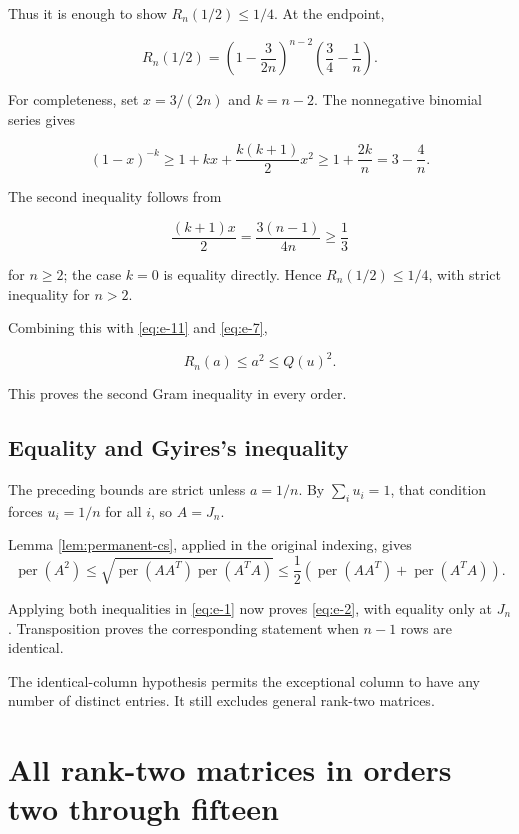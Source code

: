 \documentclass[11pt,a4paper]{article}
\theoremstyle{definition}
\theoremstyle{remark}
\begin{document}
Thus it is enough to show \(R_n(1/2)\le1/4\). At the endpoint,

\[
R_n(1/2)
=\left(1-\frac3{2n}\right)^{n-2}
\left(\frac34-\frac1n\right).
\]

For completeness, set \(x=3/(2n)\) and \(k=n-2\). The nonnegative
binomial series gives

\[
(1-x)^{-k}\ge1+kx+\frac{k(k+1)}2x^2
\ge1+\frac{2k}{n}=3-\frac4n.
\]

The second inequality follows from

\[
\frac{(k+1)x}{2}=\frac{3(n-1)}{4n}\ge\frac13
\]

for \(n\ge2\); the case \(k=0\) is equality directly. Hence
\(R_n(1/2)\le1/4\), with strict inequality for \(n>2\).

Combining this with \eqref{eq:e-11} and \eqref{eq:e-7},

\begin{equation}\label{eq:e-12}
R_n(a)\le a^2\le Q(u)^2.
\end{equation}

This proves the second Gram inequality in every order.

\subsection{Equality and Gyires's
inequality}\label{special-equality-and-the-original-gyires-inequality}

The preceding bounds are strict unless \(a=1/n\). By \(\sum_i u_i=1\),
that condition forces \(u_i=1/n\) for all \(i\), so \(A=J_n\).

Lemma \ref{lem:permanent-cs}, applied in the original indexing, gives \[
\operatorname{per}(A^2)\le\sqrt{\operatorname{per}(AA^T)\operatorname{per}(A^TA)}
\le\frac12\left(\operatorname{per}(AA^T)+\operatorname{per}(A^TA)\right).
\]

Applying both inequalities in \eqref{eq:e-1} now proves \eqref{eq:e-2}, with equality only
at \(J_n\). Transposition proves the corresponding statement when
\(n-1\) rows are identical.

The identical-column hypothesis permits the exceptional column to have any number of distinct entries.
It still excludes general rank-two matrices.


\section{All rank-two matrices in orders two through fifteen}\label{sec:rank-two-finite}
\end{document}
